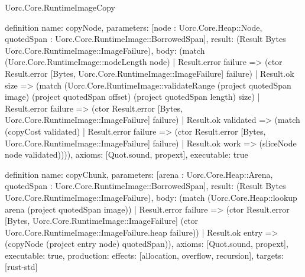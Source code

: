 \begin{lexlean}{Uorc.Core.RuntimeImageCopy}
\begin{semanticmodule}
definition{
  name: copyNode,
  parameters: [node : Uorc.Core.Heap::Node, quotedSpan : Uorc.Core.RuntimeImage::BorrowedSpan],
  result: (Result Bytes Uorc.Core.RuntimeImage::ImageFailure),
  body: (match (Uorc.Core.RuntimeImage::nodeLength node)
    | Result.error failure => (ctor Result.error [Bytes, Uorc.Core.RuntimeImage::ImageFailure] failure)
    | Result.ok size => (match (Uorc.Core.RuntimeImage::validateRange (project quotedSpan image) (project quotedSpan offset) (project quotedSpan length) size)
      | Result.error failure => (ctor Result.error [Bytes, Uorc.Core.RuntimeImage::ImageFailure] failure)
      | Result.ok validated => (match (copyCost validated)
        | Result.error failure => (ctor Result.error [Bytes, Uorc.Core.RuntimeImage::ImageFailure] failure)
        | Result.ok work => (sliceNode node validated)))),
  axioms: [Quot.sound, propext],
  executable: true
}

definition{
  name: copyChunk,
  parameters: [arena : Uorc.Core.Heap::Arena, quotedSpan : Uorc.Core.RuntimeImage::BorrowedSpan],
  result: (Result Bytes Uorc.Core.RuntimeImage::ImageFailure),
  body: (match (Uorc.Core.Heap::lookup arena (project quotedSpan image))
    | Result.error failure => (ctor Result.error [Bytes, Uorc.Core.RuntimeImage::ImageFailure] (ctor Uorc.Core.RuntimeImage::ImageFailure.heap failure))
    | Result.ok entry => (copyNode (project entry node) quotedSpan)),
  axioms: [Quot.sound, propext],
  executable: true,
  production: {effects: [allocation, overflow, recursion], targets: [rust-std]}
}
\end{semanticmodule}
\end{lexlean}
